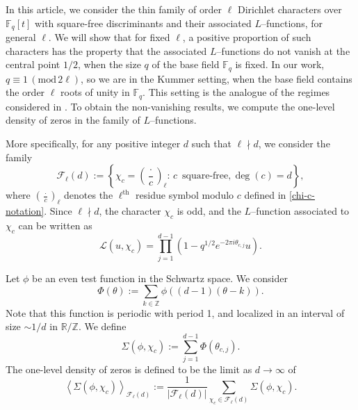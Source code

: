 \documentclass[12pt]{amsart}
\renewcommand{\pmod}[1]{\,(\mathrm{mod}\,#1)}
\def\cL{\mathcal{L}}
\begin{document}
In this article, we consider the thin family of order $\ell$ Dirichlet characters over $\mathbb{F}_q[t]$ with square-free discriminants and their associated $L$--functions, for general $\ell$. We will show that for fixed $\ell$, a positive proportion of such characters has the property that the associated $L$--functions do not vanish at the central point $1/2$, when the size $q$ of the base field $\mathbb{F}_q$ is fixed. In our work, $q \equiv 1 \pmod{2\ell}$, so we are in the Kummer setting, when the base field contains the order $\ell$ roots of unity in $\mathbb{F}_q$. This setting is the analogue of the regimes considered in \cite{dg, ddds, gao_zhao}. To obtain the non-vanishing results, we compute the one-level density of zeros in the family of $L$--functions.


More specifically, for any positive integer $d$ such that $\ell \nmid d$, we consider the family
\begin{equation}
\label{family}
\mathcal{F}_\ell(d):=\left\{\chi_c =\left(\frac{\cdot}{c}\right)_\ell :\, c\, \mbox{ square-free}, \deg(c) = d \right\},
\end{equation}
where  $(\frac{\cdot}{c})_{\ell}$ denotes the $\ell^{\text{th}}$ residue symbol modulo $c$ defined in \eqref{chi-c-notation}. Since $\ell \nmid d$, the character $\chi_c$ is odd, and 
the $L$--function associated to $\chi_c$ can be written as
$$\cL(u, \chi_c) = \prod_{j=1}^{d-1} \left( 1 -  q^{1/2} e^{- 2 \pi i \theta_{c, j}} u \right).$$

Let $\phi$ be an even test function in the Schwartz space. We consider
$$\Phi(\theta) := \sum_{k \in \mathbb{Z}} \phi ( (d-1) ( \theta-k) ).$$
Note that this function is periodic with period 1, and localized in an interval of size $ \sim 1/d$ in $\mathbb{R}/ \mathbb{Z}$. We define
\begin{equation}
\label{sigma}
\Sigma(\phi,\chi_c):=\sum_{j=1}^{d-1}\Phi\left( \theta_{c, j}\right).
\end{equation}
The one-level density of zeros is defined to be the limit as $d \to \infty$ of
\begin{equation}
\label{1ld_def}
\left\langle\Sigma(\phi,\chi_c)\right\rangle_{\mathcal{F}_\ell(d)} := \frac{1}{|\mathcal{F}_\ell(d)|}\sum_{\chi_c \in \mathcal{F}_\ell(d)}\Sigma(\phi,\chi_c).
\end{equation}
\end{document}
